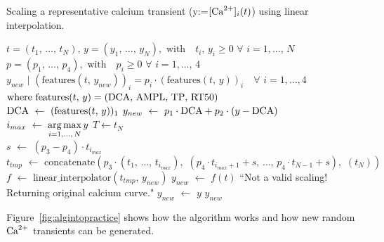 \begin{algorithm}[ht!]
    \caption{Scaling a representative calcium transient (y:=$[\textrm{Ca}^{2+}]_{i}(t)$) using linear interpolation.}\label{alg:cascaling}
    \begin{algorithmic} 
    \REQUIRE $t=(t_1,\,\dots,\,t_N),\,y=(y_1,\,\dots,\,y_N),\,\,\textrm{with}\quad t_i,\,y_i\ge 0\,\,\forall\,\,i=1,\dots,\,N$ \\ $p=(p_1,\,\dots,\,p_4),\,\,\textrm{with}\quad p_i\ge 0\,\,\forall\,\,i=1,\dots,\,4$
    \ENSURE $y_{new}\,\,|\,\,(\textrm{features}(t,\,y_{new}))_{i} = p_i\cdot(\textrm{features}(t,\,y))_{i}\quad\forall\,\,i=1,\dots,4$ \\ $\textrm{where}\,\,\textrm{features}(t,\,y) = (\textrm{DCA},\,\textrm{AMPL},\,\textrm{TP},\,\textrm{RT50})$ \\ \vspace{0.2cm}
    \STATE $\textrm{DCA}\,\,\leftarrow\,\,(\textrm{features}(t,\,y))_1$
    \STATE $y_{new}\,\,\leftarrow\,\,p_1\cdot\textrm{DCA} + p_2\cdot(y-\textrm{DCA})$
    \STATE $i_{max}\,\,\leftarrow\,\,\operatorname*{arg\,max}\limits_{i=1,\dots,\,N}{y}$
    \STATE $T \leftarrow t_{N}$ \\
    \vspace{0.2cm}
    \STATE $s\,\,\leftarrow\,\,(p_3 - p_4)\cdot t_{i_{max}}$
    \STATE $t_{tmp}\,\,\leftarrow\,\,\textrm{concatenate}(p_3\cdot (t_{1},\,\dots,\,t_{i_{max}}),\,\,(p_4\cdot t_{i_{max}+1}+s,\,\dots,\,p_4\cdot t_{N-1}+s),\,\,(t_{N}))$
    \STATE $f\,\,\leftarrow\,\,\textrm{linear\_interpolator}(t_{tmp},\, y_{new})$
    \STATE $y_{new}\,\,\leftarrow\,\,f(t)$
    \ELSE
    \PRINT ``Not a valid scaling! Returning original calcium curve."
    \STATE $y_{new}\,\,\leftarrow\,\,y$
    \ENDIF
    \RETURN $y_{new}$
    \end{algorithmic}
    \label{alg:caalg}
\end{algorithm}

\vspace{0.2cm}\noindent
Figure~\ref{fig:algintopractice} shows how the algorithm works and how new random $\textrm{Ca}^{2+}$ transients can be generated.

